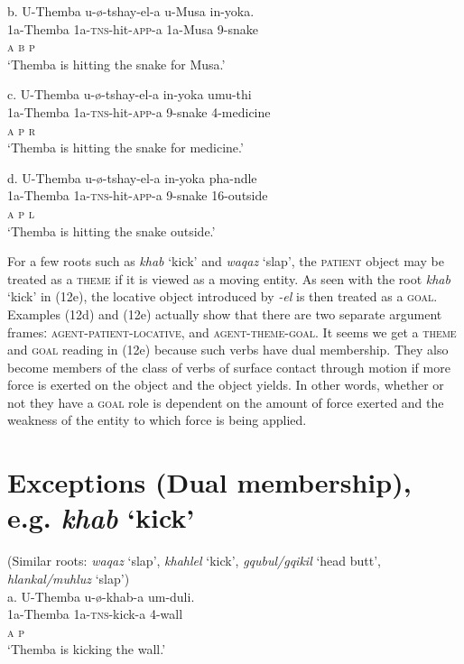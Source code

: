 \documentclass[output=paper]{langsci/langscibook}
\begin{document}
\gll   b.  U-Themba    u-ø-tshay-el-a         u-Musa     in-yoka. \\
         1a-Themba  1a-\textsc{tns}{}-hit-\textsc{app}{}-a     1a-Musa    9-snake\\
          \textsc{a                       b      p}\\
\glt     ‘Themba is hitting the snake for Musa.’  
\z

\gll   c.  U-Themba    u-ø-tshay-el-a      in-yoka    umu-thi\\
         1a-Themba   1a-\textsc{tns}{}-hit-\textsc{app}{}-a    9-snake  4-medicine\\
         \textsc{a                        p      r}\\
\glt     ‘Themba is hitting the snake for medicine.’ 
\z

\gll   d.  U-Themba    u-ø-tshay-el-a        in-yoka   pha-ndle \\
         1a-Themba   1a-\textsc{tns}{}-hit-\textsc{app}{}-a    9-snake  16-outside\\
         \textsc{a                     p        l}\\
\glt     ‘Themba is hitting the snake outside.’ 
\z

For a few roots such as \textit{khab} ‘kick’ and \textit{waqaz} ‘slap’, the \textsc{patient} object may be treated as a \textsc{theme} if it is viewed as a moving entity. As seen with the root \textit{khab} ‘kick’ in (12e), the locative object introduced by \textit{{}-el} is then treated as a \textsc{goal}. Examples (12d) and (12e) actually show that there are two separate argument framesː \textsc{agent-patient-locative}, and \textsc{agent-theme-goal}. It seems we get a \textsc{theme} and \textsc{goal} reading in (12e) because such verbs have dual membership. They also become members of the class of verbs of surface contact through motion if more force is exerted on the object and the object yields. In other words, whether or not they have a \textsc{goal} role is dependent on the amount of force exerted and the weakness of the entity to which force is being applied.

\chapter[Exceptions (Dual membership), e.g. khab ‘kick’]{Exceptions (Dual membership), e.g. \textit{khab }‘kick’}
       (Similar roots: \textit{waqaz} ‘slap’, \textit{khahlel} ‘kick’, \textit{gqubul/gqikil} ‘head butt’,  \textit{hlankal/muhluz} ‘slap’)\\
\gll   a.  U-Themba    u-ø-khab-a    um-duli. \\
         1a-Themba   1a-\textsc{tns}{}-kick-a    4-wall\\
         \textsc{a                  p}\\
\glt     ‘Themba is kicking the wall.’
\z
\end{document}
